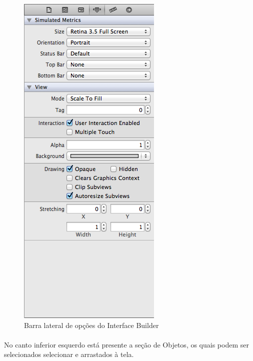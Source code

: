 \documentclass[a4paper,12pt,brazil,doubleside]{book}
\begin{document}
\begin{figure}[h]
  \centering
  \includegraphics[totalheight=0.4\textheight]{figuras/1/xib_opcoes.png}
  \caption{Barra lateral de opções do Interface Builder}
  \label{fig:a}
\end{figure}

\paragraph{}No canto inferior esquerdo está presente a seção de Objetos, os quais podem ser selecionados selecionar e arrastados à tela.
\end{document}
